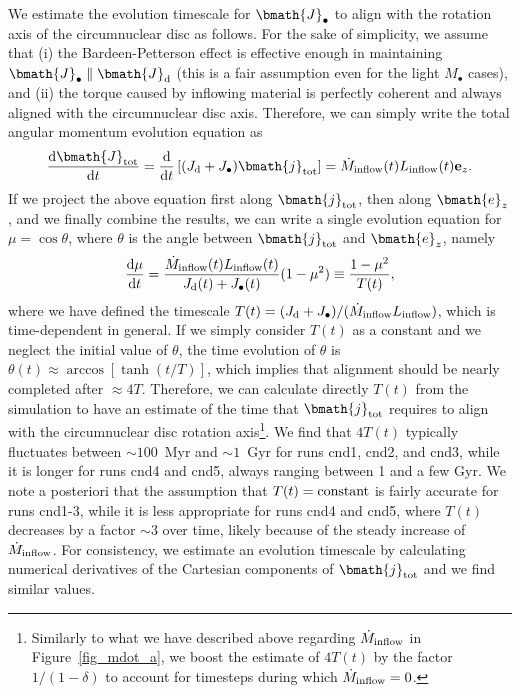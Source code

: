 \documentclass[a4paper,fleqn,usenatbib]{mnras}
\begin{document}
We estimate the evolution timescale for $\bmath{J}_{\bullet}$ to align with the rotation axis of the circumnuclear disc as follows.
For the sake of simplicity, we assume that (i) the Bardeen-Petterson effect is effective enough in maintaining $\bmath{J}_{\bullet} \parallel \bmath{J}_{\rm d}$ (this is a fair assumption even for the light $M_{\bullet}$ cases), and (ii) the torque caused by inflowing material is perfectly coherent and always aligned with the circumnuclear disc axis.
Therefore, we can simply write the total angular momentum evolution equation as 
\begin{equation}
\frac{{\rm d} \bmath{J}_{\rm tot}}{{\rm d}t} = \frac{{\rm d}}{{\rm d}t} \left[ (J_{\rm d} + J_{\bullet} ) \bmath{j}_{\rm tot} \right] = \dot{M}_{\rm inflow}(t) L_{\rm inflow}(t) \mathbf{e}_{z}.
\end{equation}
If we project the above equation first along $\bmath{j}_{\rm tot}$, then along $\bmath{e}_{z}$, and we finally combine the results, we can write a single evolution equation for $\mu = \cos \theta$, where $\theta$ is the angle between $\bmath{j}_{\rm tot}$ and $\bmath{e}_{z}$, namely
\begin{equation}
\frac{{\rm d} \mu}{{\rm d}t} =  \frac{\dot{M}_{\rm inflow}(t) L_{\rm inflow}(t)}{J_{\rm d}(t) + J_{\bullet}(t)} (1 - \mu^2) \equiv \frac{1 - \mu^2}{T(t)},
\end{equation}
where we have defined the timescale $T(t) = (J_{\rm d} + J_{\bullet})/(\dot{M}_{\rm inflow} L_{\rm inflow})$, which is time-dependent in general.
If we simply consider $T(t)$ as a constant and we neglect the initial value of $\theta$, the time evolution of $\theta$ is $\theta(t) \approx\arccos[\tanh(t/T)]$, which implies that alignment should be nearly completed after $\approx 4 T$.
Therefore, we can calculate directly $T(t)$ from the simulation to have an estimate of the time that $\bmath{j}_{\rm tot}$ requires to align with the circumnuclear disc rotation axis\footnote{Similarly to what we have described above regarding $\dot{M}_{\rm inflow}$ in Figure~\ref{fig_mdot_a}, we boost the estimate of $4 T(t)$ by the factor $1/(1 - \delta)$ to account for timesteps during which $\dot{M}_{\rm inflow} = 0$.}.
We find that $4 T(t)$ typically fluctuates between $\sim 100$~Myr and $\sim 1$~Gyr for runs cnd1, cnd2, and cnd3, while it is longer for runs cnd4 and cnd5, always ranging between 1 and a few Gyr.
We note a posteriori that the assumption that $T(t) = {\rm constant}$ is fairly accurate for runs cnd1-3, while it is less appropriate for runs cnd4 and cnd5, where $T(t)$ decreases by a factor $\sim 3$ over time, likely because of the steady increase of $\dot{M}_{\rm inflow}$.
For consistency, we estimate an evolution timescale by calculating numerical derivatives of the Cartesian components of $\bmath{j}_{\rm tot}$ and we find similar values.
\end{document}
